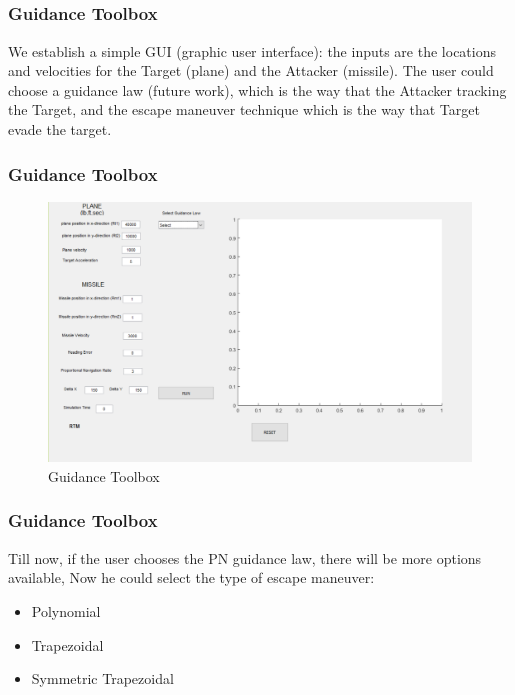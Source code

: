 \documentclass{beamer}
\begin{document}
\subsection{}
\begin{frame}
\frametitle{Guidance Toolbox}
We establish a simple GUI (graphic user interface): the inputs are the locations and velocities for the Target (plane) and the Attacker (missile). The user could choose a guidance law (future work), which is the way that the Attacker tracking the Target, and the escape maneuver technique which is the way that Target evade the target.

\end{frame}
\begin{frame}
\frametitle{Guidance Toolbox}
\begin{figure}[H]
\centering
\includegraphics[scale = 0.35]{fig/GUI.PNG}
\caption{Guidance Toolbox}
\label{Guidance Toolbox}
\end{figure}
\end{frame}
\begin{frame}
\frametitle{Guidance Toolbox}
Till now, if the user chooses the PN guidance law, there will be more options available, Now he could select the type of escape maneuver:
\begin{itemize}
\item Polynomial
\item Trapezoidal
\item Symmetric Trapezoidal
\end{itemize}
\end{frame}
\end{document}

